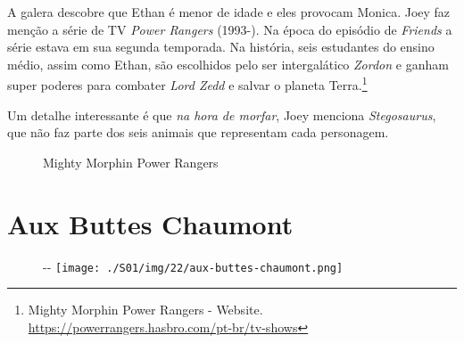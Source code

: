 A galera descobre que Ethan é menor de idade e eles provocam Monica.
Joey faz menção a série de TV \emph{Power Rangers} (1993-). Na época do
episódio de \emph{Friends} a série estava em sua segunda temporada. Na
história, seis estudantes do ensino médio, assim como Ethan, são
escolhidos pelo ser intergalático \emph{Zordon} e ganham super poderes
para combater \emph{Lord Zedd} e salvar o planeta Terra.\footnote{\sloppy Mighty Morphin Power Rangers - Website. \url{https://powerrangers.hasbro.com/pt-br/tv-shows}}

\saveparinfos
\noindent
\begin{minipage}[c]{0.45\textwidth}\useparinfo

Um detalhe interessante é que \emph{na hora de morfar}, Joey menciona
\emph{Stegosaurus}, que não faz parte dos seis animais que representam
cada personagem.

\end{minipage}\hfill
\begin{minipage}[c]{0.55\textwidth}

\begin{figure}
  \centering
    \caption{Mighty Morphin Power Rangers\label{fig:mighty-morphin-power-rangers}}
\end{figure}

\end{minipage}

\hypertarget{aux-buttes-chaumont}{%
\section{Aux Buttes Chaumont}\label{aux-buttes-chaumont}}

\begin{figure}[!ht]
  \begin{adjustwidth}{-\oddsidemargin-1in}{-\rightmargin}
    \centering
    \texttt{[image: ./S01/img/22/aux-buttes-chaumont.png]}
  \end{adjustwidth}
\end{figure}

